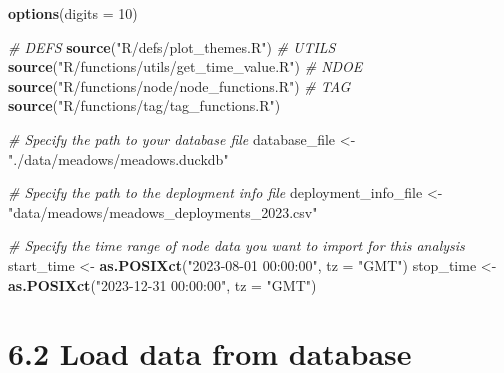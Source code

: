\documentclass[
]{book}
\newenvironment{Shaded}{\begin{snugshade}}{\end{snugshade}}
\newcommand{\AttributeTok}[1]{\textcolor[rgb]{0.13,0.29,0.53}{#1}}
\newcommand{\CommentTok}[1]{\textcolor[rgb]{0.56,0.35,0.01}{\textit{#1}}}
\newcommand{\DecValTok}[1]{\textcolor[rgb]{0.00,0.00,0.81}{#1}}
\newcommand{\FunctionTok}[1]{\textcolor[rgb]{0.13,0.29,0.53}{\textbf{#1}}}
\newcommand{\NormalTok}[1]{#1}
\newcommand{\OtherTok}[1]{\textcolor[rgb]{0.56,0.35,0.01}{#1}}
\newcommand{\StringTok}[1]{\textcolor[rgb]{0.31,0.60,0.02}{#1}}
\begin{document}
\begin{Shaded}
\begin{Highlighting}[]
\FunctionTok{options}\NormalTok{(}\AttributeTok{digits =} \DecValTok{10}\NormalTok{)}

\CommentTok{\# DEFS}
\FunctionTok{source}\NormalTok{(}\StringTok{"R/defs/plot\_themes.R"}\NormalTok{)}
\CommentTok{\# UTILS}
\FunctionTok{source}\NormalTok{(}\StringTok{"R/functions/utils/get\_time\_value.R"}\NormalTok{)}
\CommentTok{\# NDOE}
\FunctionTok{source}\NormalTok{(}\StringTok{"R/functions/node/node\_functions.R"}\NormalTok{)}
\CommentTok{\# TAG}
\FunctionTok{source}\NormalTok{(}\StringTok{"R/functions/tag/tag\_functions.R"}\NormalTok{)}

\CommentTok{\# Specify the path to your database file}
\NormalTok{database\_file }\OtherTok{\textless{}{-}} \StringTok{"./data/meadows/meadows.duckdb"}

\CommentTok{\# Specify the path to the deployment info file}
\NormalTok{deployment\_info\_file }\OtherTok{\textless{}{-}} \StringTok{"data/meadows/meadows\_deployments\_2023.csv"}

\CommentTok{\# Specify the time range of node data you want to import for this analysis}
\NormalTok{start\_time }\OtherTok{\textless{}{-}} \FunctionTok{as.POSIXct}\NormalTok{(}\StringTok{"2023{-}08{-}01 00:00:00"}\NormalTok{, }\AttributeTok{tz =} \StringTok{"GMT"}\NormalTok{)}
\NormalTok{stop\_time }\OtherTok{\textless{}{-}} \FunctionTok{as.POSIXct}\NormalTok{(}\StringTok{"2023{-}12{-}31 00:00:00"}\NormalTok{, }\AttributeTok{tz =} \StringTok{"GMT"}\NormalTok{)}
\end{Highlighting}
\end{Shaded}

\section{6.2 Load data from database}\label{load-data-from-database-1}
\end{document}
